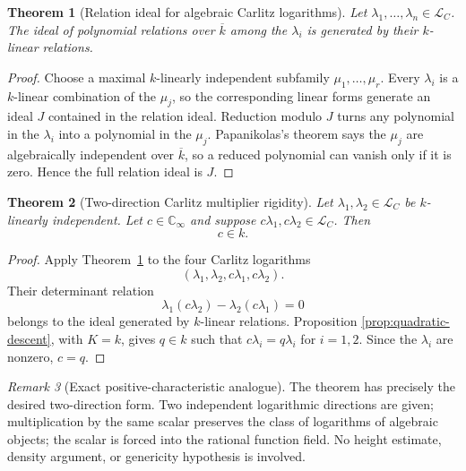 \documentclass[11pt,oneside]{article}
\newtheorem{theorem}{Theorem}[section]
\theoremstyle{definition}
\theoremstyle{remark}
\newtheorem{remark}[theorem]{Remark}
\newcommand{\C}{\mathbb C}
\newcommand{\cL}{\mathcal L}
\begin{document}
\begin{theorem}[Relation ideal for algebraic Carlitz logarithms]
\label{thm:Carlitz-relation-ideal}
Let $\lambda_1,\ldots,\lambda_n\in\cL_C$.  The ideal of polynomial relations over $\overline{k}$
among the $\lambda_i$ is generated by their $k$-linear relations.
\end{theorem}

\begin{proof}
Choose a maximal $k$-linearly independent subfamily
$\mu_1,\ldots,\mu_r$.  Every $\lambda_i$ is a $k$-linear combination of the $\mu_j$, so the
corresponding linear forms generate an ideal $J$ contained in the relation ideal.  Reduction modulo
$J$ turns any polynomial in the $\lambda_i$ into a polynomial in the $\mu_j$.  Papanikolas's
theorem says the $\mu_j$ are algebraically independent over $\overline{k}$, so a reduced
polynomial can vanish only if it is zero.  Hence the full relation ideal is $J$.
\end{proof}

\begin{theorem}[Two-direction Carlitz multiplier rigidity]
\label{thm:Carlitz-multiplier}
Let $\lambda_1,\lambda_2\in\cL_C$ be $k$-linearly independent.  Let $c\in\C_\infty$ and suppose
$c\lambda_1,c\lambda_2\in\cL_C$.  Then
\begin{equation}
  c\in k.
  \label{eq:Carlitz-multiplier-rational}
\end{equation}
\end{theorem}

\begin{proof}
Apply Theorem~\ref{thm:Carlitz-relation-ideal} to the four Carlitz logarithms
\[
  (\lambda_1,\lambda_2,c\lambda_1,c\lambda_2).
\]
Their determinant relation
\[
  \lambda_1(c\lambda_2)-\lambda_2(c\lambda_1)=0
\]
belongs to the ideal generated by $k$-linear relations.  Proposition
\ref{prop:quadratic-descent}, with $K=k$, gives $q\in k$ such that
$c\lambda_i=q\lambda_i$ for $i=1,2$.  Since the $\lambda_i$ are nonzero, $c=q$.
\end{proof}

\begin{remark}[Exact positive-characteristic analogue]
The theorem has precisely the desired two-direction form.  Two independent logarithmic directions
are given; multiplication by the same scalar preserves the class of logarithms of algebraic
objects; the scalar is forced into the rational function field.  No height estimate, density
argument, or genericity hypothesis is involved.
\end{remark}
\end{document}
